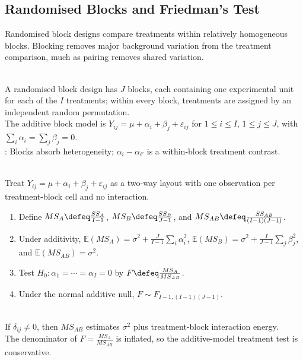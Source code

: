 \subsection{Randomised Blocks and Friedman's Test}

Randomised block designs compare treatments within relatively homogeneous blocks.  Blocking removes major background variation from the treatment comparison, much as pairing removes shared variation.

\begin{definition} \label{def:randomized-block-design} \\
A randomised block design has $J$ blocks, each containing one experimental unit for each of the $I$ treatments; within every block, treatments are assigned by an independent random permutation.\\
The additive block model is $Y_{ij}=\mu+\alpha_i+\beta_j+\varepsilon_{ij}$ for $1\leq i\leq I$, $1\leq j\leq J$, with $\sum\limits_i\alpha_i=\sum\limits_j\beta_j=0$.\\
: Blocks absorb heterogeneity; $\alpha_i-\alpha_{i'}$ is a within-block treatment contrast.
\end{definition}

\begin{method} \label{meth:randomized-block-f-test} \\
Treat $Y_{ij}=\mu+\alpha_i+\beta_j+\varepsilon_{ij}$ as a two-way layout with one observation per treatment-block cell and no interaction.
\begin{enumerate}[label=(\roman*)]
\setlength{\itemsep}{0pt}
\item
Define $MS_A\defeq \frac{SS_A}{I-1}$, $MS_B\defeq \frac{SS_B}{J-1}$, and $MS_{AB}\defeq \frac{SS_{AB}}{(I-1)(J-1)}$.
\item
Under additivity, $\mathbb{E}(MS_A)=\sigma^2+\frac{J}{I-1}\sum\limits_i\alpha_i^2$, $\mathbb{E}(MS_B)=\sigma^2+\frac{I}{J-1}\sum\limits_j\beta_j^2$, and $\mathbb{E}(MS_{AB})=\sigma^2$.
\item
Test $H_0:\alpha_1=\cdots=\alpha_I=0$ by $F\defeq \frac{MS_A}{MS_{AB}}$.
\item
Under the normal additive null, $F\sim F_{I-1,(I-1)(J-1)}$.
\end{enumerate}
\end{method}

\begin{remark} \label{rem:block-interaction-conservatism} \\
If $\delta_{ij}\neq0$, then $MS_{AB}$ estimates $\sigma^2$ plus treatment-block interaction energy.\\
The denominator of $F=\frac{MS_A}{MS_{AB}}$ is inflated, so the additive-model treatment test is conservative.
\end{remark}

